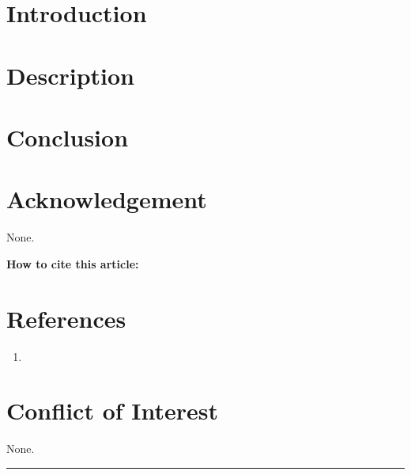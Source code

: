 \documentclass[10pt]{article} %
\begin{document}
\begin{multicols}{2}
\fontsize{9}{10.8}\selectfont\color{color_29791}

\section*{Introduction}
\section*{Description}

\section*{Conclusion}

\section*{Acknowledgement}
None.

\begin{framed}
\noindent\fontsize{8.5}{10.2}\selectfont
\textbf{How to cite this article:} 
\end{framed}

\section*{References}
\fontsize{8}{9.6}\selectfont
\begin{enumerate}
        \item \href{\VAR{item.parentLink}}{ }
\end{enumerate}

\section*{Conflict of Interest}
None.

\end{multicols}

\vfill
\noindent
\hspace*{0pt}\color{color_100238}\rule{\textwidth}{1pt}
\par\vspace{0.3cm} %
\end{document}
